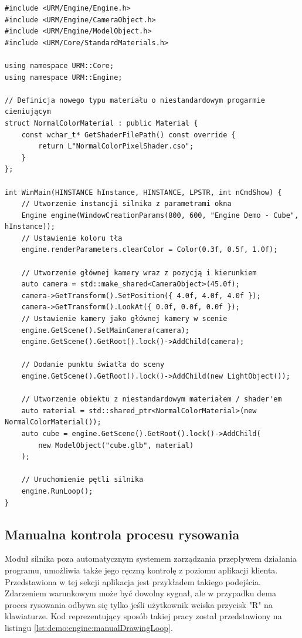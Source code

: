 \vfill

\begin{lstlisting}[caption={Pełny kod programu wykorzystującego API silnika do wyświetlenia trzech sześcianów o różnych materiałach.}, label={lst:demo:engine:cube}]
#include <URM/Engine/Engine.h>
#include <URM/Engine/CameraObject.h>
#include <URM/Engine/ModelObject.h>
#include <URM/Core/StandardMaterials.h>

using namespace URM::Core;
using namespace URM::Engine;

// Definicja nowego typu materiału o niestandardowym progarmie cieniującym
struct NormalColorMaterial : public Material {
	const wchar_t* GetShaderFilePath() const override { 
		return L"NormalColorPixelShader.cso";
	}
};
	
int WinMain(HINSTANCE hInstance, HINSTANCE, LPSTR, int nCmdShow) {
	// Utworzenie instancji silnika z parametrami okna
	Engine engine(WindowCreationParams(800, 600, "Engine Demo - Cube", hInstance));
	// Ustawienie koloru tła
	engine.renderParameters.clearColor = Color(0.3f, 0.5f, 1.0f);
	
	// Utworzenie głównej kamery wraz z pozycją i kierunkiem
	auto camera = std::make_shared<CameraObject>(45.0f);
	camera->GetTransform().SetPosition({ 4.0f, 4.0f, 4.0f });
	camera->GetTransform().LookAt({ 0.0f, 0.0f, 0.0f });
	// Ustawienie kamery jako głównej kamery w scenie
	engine.GetScene().SetMainCamera(camera);
	engine.GetScene().GetRoot().lock()->AddChild(camera);
	
	// Dodanie punktu światła do sceny
	engine.GetScene().GetRoot().lock()->AddChild(new LightObject());
	
	// Utworzenie obiektu z niestandardowym materiałem / shader'em
	auto material = std::shared_ptr<NormalColorMaterial>(new NormalColorMaterial());
	auto cube = engine.GetScene().GetRoot().lock()->AddChild(
		new ModelObject("cube.glb", material)
	);
	
	// Uruchomienie pętli silnika
	engine.RunLoop();
}
\end{lstlisting}

\subsection{Manualna kontrola procesu rysowania}
Moduł silnika poza automatycznym systemem zarządzania przepływem działania programu, umożliwia także jego ręczną kontrolę z poziomu aplikacji klienta. Przedstawiona w tej sekcji aplikacja jest przykładem takiego podejścia. Zdarzeniem warunkowym może być dowolny sygnał, ale w przypadku dema proces rysowania odbywa się tylko jeśli użytkownik wciska przycisk "R" na klawiaturze. Kod reprezentujący sposób takiej pracy został przedstawiony na listingu \ref{lst:demo:engine:manualDrawingLoop}.

